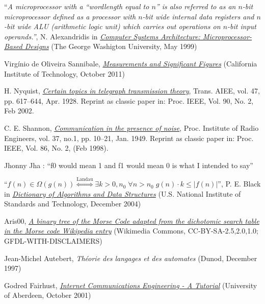 \documentclass[a4paper]{report}
\begin{document}
\begin{thebibliography}{99}
``{\it A microprocessor with a ``wordlength equal to $n$'' is also referred to as an $n$-bit microprocessor defined as a processor with $n$-bit wide internal data registers and $n$-bit wide ALU (arithmetic logic unit) which carries out operations on $n$-bit input operands.''}, N. Alexandridis in {\it \href{http://www.student.seas.gwu.edu/~kallitec/ece201/TextbookFigures/000-Chapter1.pdf}{Computer Systems Architecture: Microprocessor-Based Designs}} (The George Washigton University, May 1999)

Virg\'inio de Oliveira Sannibale, {\it \href{http://www.ligo.caltech.edu/~vsanni/ph3/SignificantFiguresAndMeasurements/SignificantFiguresAndMeasurements.pdf}{Measurements and Significant Figures}} (California Institute of Technology, October 2011)

H. Nyquist, {\it \href{http://replay.web.archive.org/20060706192816/http://www.loe.ee.upatras.gr/Comes/Notes/Nyquist.pdf}{Certain topics in telegraph transmission theory}}, Trans. AIEE, vol. 47, pp. 617–644, Apr. 1928. Reprint as classic paper in: Proc. IEEE, Vol. 90, No. 2, Feb 2002.

C. E. Shannon, {\it \href{http://www.stanford.edu/class/ee104/shannonpaper.pdf}{Communication in the presence of noise}}, Proc. Institute of Radio Engineers, vol. 37, no.1, pp. 10–21, Jan. 1949. Reprint as classic paper in: Proc. IEEE, Vol. 86, No. 2, (Feb 1998).

 Jhonny Jha : ``f0 would mean 1 and f1 would mean 0 is what I intended to say''

 ``$f(n) \in \Omega \left ( g(n) \right ) \stackrel{\mathrm{Landau}}{\Leftrightarrow} \exists k>0, n_0 \; \forall n>n_0 \; g(n)\cdot k \leq |f(n)|$'', P. E. Black in {\it \href{http://www.nist.gov/dads/}{Dictionary of Algorithms and Data Structures}} (U.S. National Institute of Standards and Technology, December 2004)

 Aris00, {\it \href{http://en.wikipedia.org/wiki/File:Morse_code_tree3.png}{A binary tree of the Morse Code adapted from the dichotomic search table in the Morse code Wikipedia entry}} (Wikimedia Commons, CC-BY-SA-2.5,2.0,1.0; GFDL-WITH-DISCLAIMERS)

Jean-Michel Autebert, {\it Th\'eorie des langages et des automates} (Dunod, December 1997)

Godred Fairhust, {\it \href{http://www.erg.abdn.ac.uk/~gorry/eg3567/phy-pages/nrz.html}{Internet Communications Engineering - A Tutorial}} (University of Aberdeen, October 2001)

\end{thebibliography}
\end{document}
